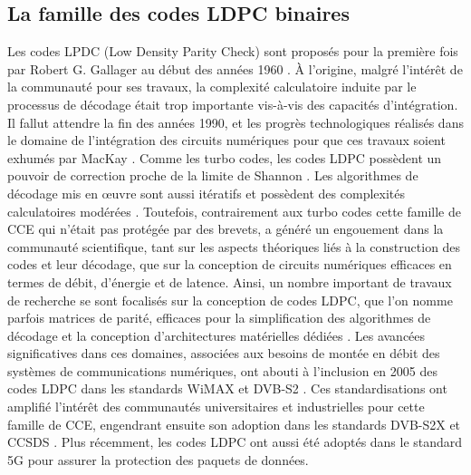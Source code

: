 \documentclass[../main.tex]{subfiles}
\begin{document}
\subsection{La famille des codes LDPC binaires}
% 
% 
% 
Les codes LPDC (Low Density Parity Check) sont proposés pour la première fois par Robert G. Gallager au début des années 1960 \cite{LDPC1}. À l’origine, malgré l’intérêt de la communauté pour ses travaux, la complexité calculatoire induite par le processus de décodage était trop importante vis-à-vis des capacités d’intégration. Il fallut attendre la fin des années 1990, et les progrès technologiques réalisés dans le domaine de l’intégration des circuits numériques pour que ces travaux soient exhumés par MacKay \cite{LDPC2}. Comme les turbo codes, les codes LDPC possèdent un pouvoir de correction proche de la limite de Shannon \cite{LDPC2}. Les algorithmes de décodage mis en œuvre sont aussi itératifs et possèdent des complexités calculatoires modérées \cite{LDPC3,LDPC4}. Toutefois, contrairement aux turbo codes cette famille de CCE qui n’était pas protégée par des brevets, a généré un engouement dans la communauté scientifique, tant sur les aspects théoriques liés à la construction des codes et leur décodage, que sur la conception de circuits numériques efficaces en termes de débit, d'énergie et de latence.
Ainsi, un nombre important de travaux de recherche se sont focalisés sur la conception de codes LDPC, que l’on nomme parfois matrices de parité, efficaces \cite{LDPC5, LDPC6} pour la simplification des algorithmes de décodage \cite{LDPC:MS} et la conception d’architectures matérielles dédiées \cite{Hailes2016}. Les avancées significatives dans ces domaines, associées aux besoins de montée en débit des systèmes de communications numériques, ont abouti à l’inclusion en 2005 des codes LDPC dans les standards WiMAX \cite{Ref_Wimax} et DVB-S2 \cite{DVB:S2}. Ces standardisations ont amplifié l’intérêt des communautés universitaires et industrielles pour cette famille de CCE, engendrant ensuite son adoption dans les standards DVB-S2X \cite{DVB:S2x} et CCSDS \cite{CCSDS}. Plus récemment, les codes LDPC ont aussi été adoptés dans le standard 5G \cite{5g} pour assurer la protection des paquets de données. 
\end{document}
